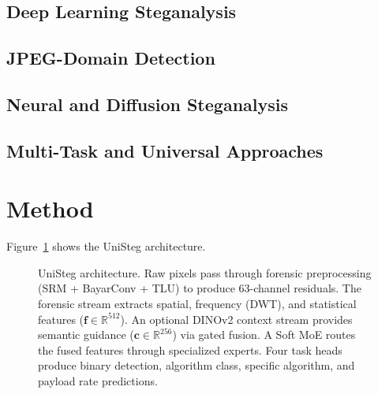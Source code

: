 \documentclass[conference]{IEEEtran}
\newcommand{\method}{UniSteg}
\begin{document}
\subsection{Deep Learning Steganalysis}


\subsection{JPEG-Domain Detection}


\subsection{Neural and Diffusion Steganalysis}


\subsection{Multi-Task and Universal Approaches}


\section{Method}
\label{sec:method}

Figure~\ref{fig:architecture} shows the \method{} architecture.

\begin{figure}[t]
  \centering
  \caption{\method{} architecture. Raw pixels pass through forensic preprocessing (SRM + BayarConv + TLU) to produce 63-channel residuals. The forensic stream extracts spatial, frequency (DWT), and statistical features ($\mathbf{f} \in \mathbb{R}^{512}$). An optional DINOv2 context stream provides semantic guidance ($\mathbf{c} \in \mathbb{R}^{256}$) via gated fusion. A Soft MoE routes the fused features through specialized experts. Four task heads produce binary detection, algorithm class, specific algorithm, and payload rate predictions.}
  \label{fig:architecture}
\end{figure}
\end{document}
